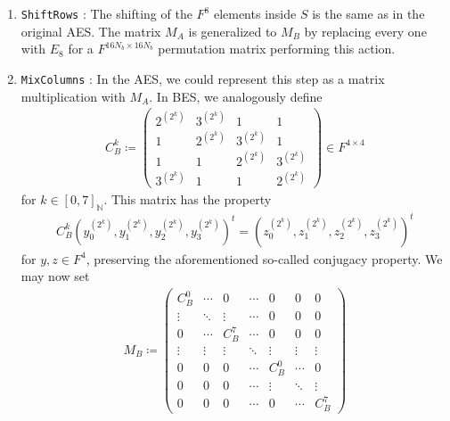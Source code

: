 \begin{enumerate}[label=(\roman*')]
    \item \texttt{ShiftRows} \cite[pp. 5-6]{Murphy2002}: The shifting of the \(F^8\) elements inside \(S\) is the same as in the original AES. The matrix \(M_A\) is generalized to \(M_B\) by replacing every one with \(E_8\) for a \(F^{16N_b \times 16N_b}\) permutation matrix performing this action.
    \item \texttt{MixColumns} \cite[p. 6]{Murphy2002}: In the AES, we could represent this step as a matrix multiplication with \(M_A\). In BES, we analogously define
    \begin{align}
        C_B^k \coloneqq \begin{pmatrix}
            2^{\left(2^k\right)} & 3^{\left(2^k\right)} & 1 & 1\\
            1 & 2^{\left(2^k\right)} & 3^{\left(2^k\right)} & 1\\
            1 & 1 & 2^{\left(2^k\right)} & 3^{\left(2^k\right)}\\
            3^{\left(2^k\right)} & 1 & 1 & 2^{\left(2^k\right)}
        \end{pmatrix} \in F^{4 \times 4}
    \end{align}
    for \(k \in [0, 7]_{\mathbb{N}}\). This matrix has the property
    \begin{align}
        C_B^k \left(y_0^{\left(2^k\right)}, y_1^{\left(2^k\right)}, y_2^{\left(2^k\right)}, y_3^{\left(2^k\right)}\right)^t = \left(z_0^{\left(2^k\right)}, z_1^{\left(2^k\right)}, z_2^{\left(2^k\right)}, z_3^{\left(2^k\right)}\right)^t
    \end{align}
    for \(y, z \in F^4\), preserving the aforementioned so-called conjugacy property. We may now set
    \begin{align}
        M_B \coloneqq \begin{pmatrix}
              C_B^0 & \cdots &      0 & \cdots &      0 &      0 &      0\\
             \vdots & \ddots & \vdots & \cdots &      0 &      0 &      0\\
                  0 & \cdots &  C_B^7 & \cdots &      0 &      0 &      0\\
             \vdots & \vdots & \vdots & \ddots & \vdots & \vdots & \vdots\\
                  0 &      0 &      0 & \cdots &  C_B^0 & \cdots &      0\\
                  0 &      0 &      0 & \cdots & \vdots & \ddots & \vdots\\
                  0 &      0 &      0 & \cdots &      0 & \cdots &  C_B^7

\end{pmatrix}
\end{align}
\end{enumerate}
